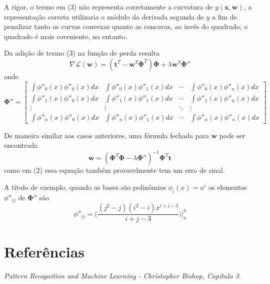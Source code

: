 \documentclass{article}
\begin{document}
A rigor, o termo em (3) não representa corretamente a curvatura de \( y(\textbf{x}, \textbf{w}) \), a representação
correta utilizaria o módulo da derivada segunda de \( y \) a fim de penalizar tanto as curvas convexas quanto as concavas, ao
invés do quadrado; o quadrado é mais coveniente, no entanto.

Da adição de termo (3) na função de perda resulta
\begin{equation}
    \nabla \mathcal{L}(\textbf{w}) = (\textbf{t}^T - \textbf{w}^T \boldsymbol{\Phi}^T) \boldsymbol{\Phi} + \lambda \textbf{w}^T \boldsymbol{\Phi}''
\end{equation}
onde
\[
\boldsymbol{\Phi}'' =
    \begin{bmatrix}
        \int \phi''_0(x) \phi''_0(x) dx & \int \phi''_0(x) \phi''_1(x) dx & \dotsb & \int \phi''_0(x) \phi''_n(x) dx \\
        \int \phi''_1(x) \phi''_0(x) dx & \int \phi''_1(x) \phi''_1(x) dx & \dotsb & \int \phi''_1(x) \phi''_n(x) dx \\
        \vdots & \vdots & \ddots & \vdots \\
        \int \phi''_n(x) \phi''_0(x) dx & \int \phi''_n(x) \phi''_1(x) dx & \dotsb & \int \phi''_n(x) \phi''_n(x) dx
    \end{bmatrix}
\]

De maneira similar aos casos anteriores, uma fórmula fechada para \( \textbf{w} \) pode ser encontrada
\[
    \textbf{w} = (\boldsymbol{\Phi}^T \boldsymbol{\Phi} - \lambda \boldsymbol{\Phi}'' )^{-1} \boldsymbol{\Phi}^T \textbf{t}
\]
como em (2) essa equação também provavelmente tem um erro de sinal.

A título de exemplo, quando as bases são polinômios \( \phi_i(x) = x^i \) os elementos \( \phi''_{i j} \) de \( \boldsymbol{\Phi}'' \)
são
\[
    \phi''_{i j} = \Bigg(\frac{(j^2 - j)(i^2 - i)x^{i+j-3}}{i+j-3} \Bigg) \biggr\rvert_{a}^{b}
\]

\section{Referências}

\emph{Pattern Recognition and Machine Learning - Christopher Bishop, Capítulo 3.}
\end{document}

